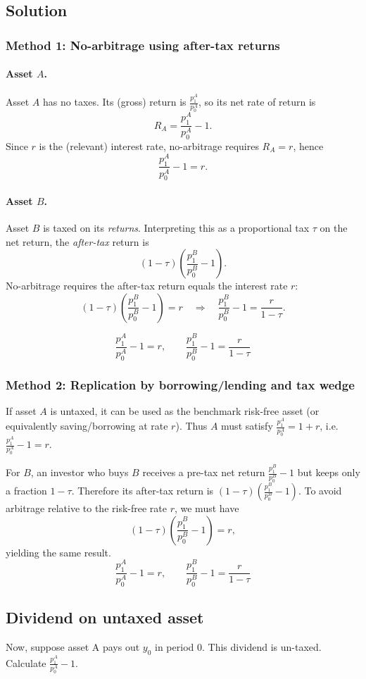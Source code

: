 \documentclass[12pt]{article}
\begin{document}
\subsection*{Solution}
\subsubsection*{Method 1: No-arbitrage using after-tax returns}
\paragraph{Asset \(A\).}
Asset \(A\) has no taxes. Its (gross) return is \(\frac{p^A_1}{p^A_0}\), so its net rate of return is
\[
R_A=\frac{p^A_1}{p^A_0}-1.
\]
Since \(r\) is the (relevant) interest rate, no-arbitrage requires \(R_A=r\), hence
\[
\frac{p^A_1}{p^A_0}-1=r.
\]

\paragraph{Asset \(B\).}
Asset \(B\) is taxed on its \emph{returns}. Interpreting this as a proportional tax \(\tau\) on the net return,
the \emph{after-tax} return is
\[
(1-\tau)\left(\frac{p^B_1}{p^B_0}-1\right).
\]
No-arbitrage requires the after-tax return equals the interest rate \(r\):
\[
(1-\tau)\left(\frac{p^B_1}{p^B_0}-1\right)=r
\quad\Rightarrow\quad
\frac{p^B_1}{p^B_0}-1=\frac{r}{1-\tau}.
\]

\[
\boxed{\;\frac{p^A_1}{p^A_0}-1=r,\qquad \frac{p^B_1}{p^B_0}-1=\frac{r}{1-\tau}\;}
\]

\subsubsection*{Method 2: Replication by borrowing/lending and tax wedge}
If asset \(A\) is untaxed, it can be used as the benchmark risk-free asset (or equivalently saving/borrowing at rate \(r\)).
Thus \(A\) must satisfy \(\frac{p^A_1}{p^A_0}=1+r\), i.e. \(\frac{p^A_1}{p^A_0}-1=r\).

For \(B\), an investor who buys \(B\) receives a pre-tax net return \(\frac{p^B_1}{p^B_0}-1\) but keeps only a fraction \(1-\tau\).
Therefore its after-tax return is \((1-\tau)\left(\frac{p^B_1}{p^B_0}-1\right)\).
To avoid arbitrage relative to the risk-free rate \(r\), we must have
\[
(1-\tau)\left(\frac{p^B_1}{p^B_0}-1\right)=r,
\]
yielding the same result.
\[
\boxed{\;\frac{p^A_1}{p^A_0}-1=r,\qquad \frac{p^B_1}{p^B_0}-1=\frac{r}{1-\tau}\;}
\]

\subsection{Dividend on untaxed asset}
Now, suppose asset A pays out \(y_0\) in period 0. This dividend is un-taxed. Calculate
\(\frac{p^A_1}{p^A_0}-1\).
\end{document}

